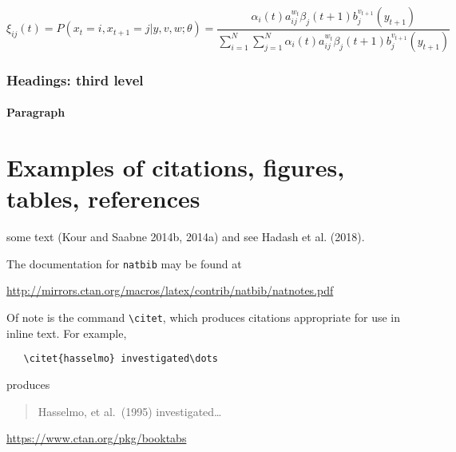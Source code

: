 \documentclass{article}
\begin{document}
\lipsum[5]

\begin{equation}
\xi _{ij}(t)=P(x_{t}=i,x_{t+1}=j|y,v,w;\theta)= {\frac {\alpha _{i}(t)a^{w_t}_{ij}\beta _{j}(t+1)b^{v_{t+1}}_{j}(y_{t+1})}{\sum _{i=1}^{N} \sum _{j=1}^{N} \alpha _{i}(t)a^{w_t}_{ij}\beta _{j}(t+1)b^{v_{t+1}}_{j}(y_{t+1})}}
\end{equation}

\hypertarget{headings-third-level}{%
\subsubsection{Headings: third level}\label{headings-third-level}}

\lipsum[6]

\paragraph{Paragraph}
\lipsum[7]

\hypertarget{examples-of-citations-figures-tables-references}{%
\section{Examples of citations, figures, tables,
references}\label{examples-of-citations-figures-tables-references}}

\label{sec:others}

\lipsum[8] some text (Kour and Saabne 2014b, 2014a) and see Hadash et
al. (2018).

The documentation for \verb+natbib+ may be found at

\begin{center}
  \url{http://mirrors.ctan.org/macros/latex/contrib/natbib/natnotes.pdf}
\end{center}

Of note is the command \verb+\citet+, which produces citations
appropriate for use in inline text. For example,

\begin{verbatim}
   \citet{hasselmo} investigated\dots
\end{verbatim}

produces

\begin{quote}
  Hasselmo, et al.\ (1995) investigated\dots
\end{quote}

\begin{center}
  \url{https://www.ctan.org/pkg/booktabs}
\end{center}
\end{document}
